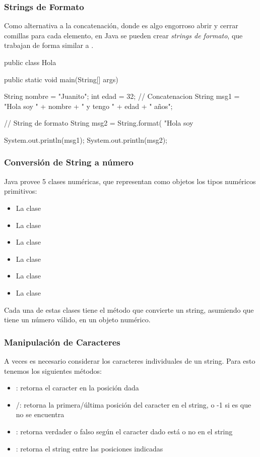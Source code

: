 \documentclass{beamer}
\begin{document}
\begin{frame}[fragile]
  \frametitle{Strings de Formato}

  Como alternativa a la concatenación, donde es algo engorroso abrir y
  cerrar comillas para cada elemento, en Java se pueden crear
  \emph{strings de formato}, que trabajan de forma similar a
  .

  \begin{jsmall}
    public class Hola {
      public static void main(String[] args) {
        String nombre = "Juanito";
        int edad = 32;
        // Concatenacion
        String msg1 = "Hola soy " + nombre + " y tengo " + edad + " años";

        // String de formato
        String msg2 = String.format(
            "Hola soy %

        System.out.println(msg1);
        System.out.println(msg2);        
      }
    }
  \end{jsmall}
  
\end{frame}

\begin{frame}
  \frametitle{Conversión de String a número}

  Java provee 5 clases numéricas, que representan como objetos los
  tipos numéricos primitivos:

  \begin{itemize}
    \setlength\itemsep{0.2em}
  \item La clase 
  \item La clase 
  \item La clase 
  \item La clase 
  \item La clase 
  \item La clase 
  \end{itemize}

  Cada una de estas clases tiene el método  que
  convierte un string, asumiendo que tiene un número válido, en un
  objeto numérico.
  
\end{frame}

\begin{frame}
  \frametitle{Manipulación de Caracteres}
  A veces es necesario considerar los caracteres individuales de un
  string. Para esto tenemos los siguientes métodos:

  \begin{itemize}
  \item {}: retorna el caracter en la posición dada
  \item {}/: retorna la primera/última
    posición del caracter en el string, o -1 si es que no se encuentra
  \item {}: retorna verdader o falso según el caracter
    dado está o no en el string
  \item {}: retorna el string entre las posiciones
    indicadas
  \end{itemize}
  
\end{frame}
\end{document}
